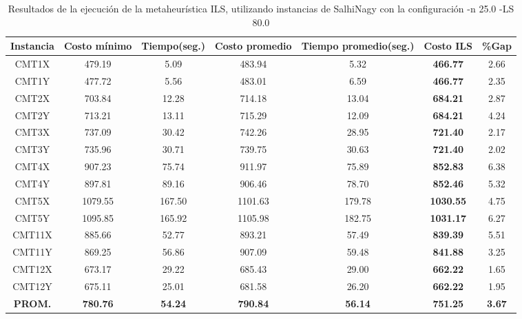 \begin{table}[ht]
\caption{Resultados de la ejecución de la metaheurística ILS, utilizando instancias de SalhiNagy con la configuración -n 25.0 -LS 80.0}
\centering
\small
\begin{tabular}{c c c c c c c}
\hline\hline
Instancia & Costo mínimo & Tiempo(seg.) & Costo promedio & Tiempo promedio(seg.) & Costo ILS & \%Gap \\ [0.5ex]
\hline
CMT1X & 479.19 & 5.09 & 
483.94 & 5.32 & \bf{466.77} & 
2.66\\CMT1Y & 477.72 & 5.56 & 
483.01 & 6.59 & \bf{466.77} & 
2.35\\CMT2X & 703.84 & 12.28 & 
714.18 & 13.04 & \bf{684.21} & 
2.87\\CMT2Y & 713.21 & 13.11 & 
715.29 & 12.09 & \bf{684.21} & 
4.24\\CMT3X & 737.09 & 30.42 & 
742.26 & 28.95 & \bf{721.40} & 
2.17\\CMT3Y & 735.96 & 30.71 & 
739.75 & 30.63 & \bf{721.40} & 
2.02\\CMT4X & 907.23 & 75.74 & 
911.97 & 75.89 & \bf{852.83} & 
6.38\\CMT4Y & 897.81 & 89.16 & 
906.46 & 78.70 & \bf{852.46} & 
5.32\\CMT5X & 1079.55 & 167.50 & 
1101.63 & 179.78 & \bf{1030.55} & 
4.75\\CMT5Y & 1095.85 & 165.92 & 
1105.98 & 182.75 & \bf{1031.17} & 
6.27\\CMT11X & 885.66 & 52.77 & 
893.21 & 57.49 & \bf{839.39} & 
5.51\\CMT11Y & 869.25 & 56.86 & 
907.09 & 59.48 & \bf{841.88} & 
3.25\\CMT12X & 673.17 & 29.22 & 
685.43 & 29.00 & \bf{662.22} & 
1.65\\CMT12Y & 675.11 & 25.01 & 
681.58 & 26.20 & \bf{662.22} & 
1.95\\\bf{PROM.} & 
\bf{780.76} & \bf{54.24} & \bf{790.84} & \bf{56.14} & \bf{751.25} & \bf{3.67}\\[1ex]\hline
\end{tabular}
\label{table:nonlin}
\end{table} \clearpage
